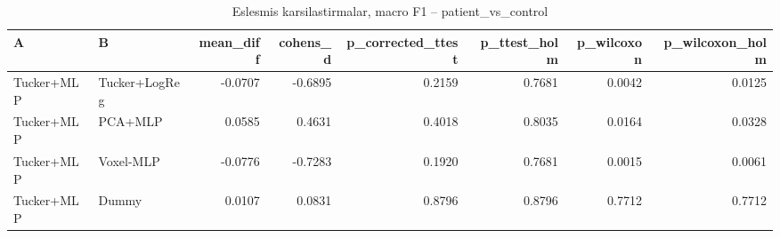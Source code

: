 \begin{table}[htbp]
  \centering
  \caption{Eslesmis karsilastirmalar, macro F1 -- patient\_vs\_control}
  \label{tab:tests_patient_vs_control}
  \small
  \begin{tabular}{llrrrrrr}
    \toprule
    A & B & mean\_diff & cohens\_d & p\_corrected\_ttest & p\_ttest\_holm & p\_wilcoxon & p\_wilcoxon\_holm \\
    \midrule
    Tucker+MLP & Tucker+LogReg & -0.0707 & -0.6895 & 0.2159 & 0.7681 & 0.0042 & 0.0125 \\
    Tucker+MLP & PCA+MLP & 0.0585 & 0.4631 & 0.4018 & 0.8035 & 0.0164 & 0.0328 \\
    Tucker+MLP & Voxel-MLP & -0.0776 & -0.7283 & 0.1920 & 0.7681 & 0.0015 & 0.0061 \\
    Tucker+MLP & Dummy & 0.0107 & 0.0831 & 0.8796 & 0.8796 & 0.7712 & 0.7712 \\
    \bottomrule
  \end{tabular}
\end{table}
